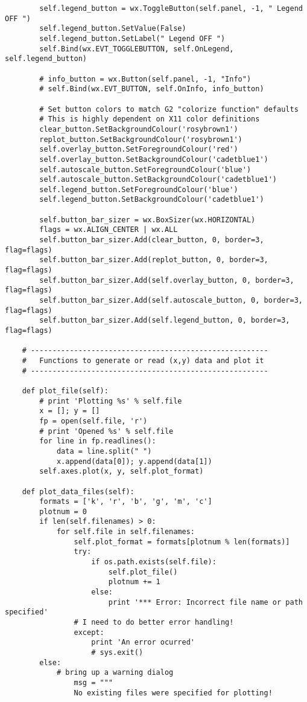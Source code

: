 \documentclass[12pt]{article}
\begin{document}
\begin{verbatim}
        self.legend_button = wx.ToggleButton(self.panel, -1, " Legend OFF ")
        self.legend_button.SetValue(False)
        self.legend_button.SetLabel(" Legend OFF ")
        self.Bind(wx.EVT_TOGGLEBUTTON, self.OnLegend, self.legend_button)

        # info_button = wx.Button(self.panel, -1, "Info")
        # self.Bind(wx.EVT_BUTTON, self.OnInfo, info_button)

        # Set button colors to match G2 "colorize function" defaults
        # This is highly dependent on X11 color definitions
        clear_button.SetBackgroundColour('rosybrown1')
        replot_button.SetBackgroundColour('rosybrown1')
        self.overlay_button.SetForegroundColour('red')
        self.overlay_button.SetBackgroundColour('cadetblue1')
        self.autoscale_button.SetForegroundColour('blue')
        self.autoscale_button.SetBackgroundColour('cadetblue1')
        self.legend_button.SetForegroundColour('blue')
        self.legend_button.SetBackgroundColour('cadetblue1')

        self.button_bar_sizer = wx.BoxSizer(wx.HORIZONTAL)
        flags = wx.ALIGN_CENTER | wx.ALL
        self.button_bar_sizer.Add(clear_button, 0, border=3, flag=flags)
        self.button_bar_sizer.Add(replot_button, 0, border=3, flag=flags)
        self.button_bar_sizer.Add(self.overlay_button, 0, border=3, flag=flags)
        self.button_bar_sizer.Add(self.autoscale_button, 0, border=3, flag=flags)
        self.button_bar_sizer.Add(self.legend_button, 0, border=3, flag=flags)

    # -------------------------------------------------------
    #   Functions to generate or read (x,y) data and plot it
    # -------------------------------------------------------

    def plot_file(self):
        # print 'Plotting %s' % self.file
        x = []; y = []
        fp = open(self.file, 'r')
        # print 'Opened %s' % self.file
        for line in fp.readlines():
            data = line.split(" ")
            x.append(data[0]); y.append(data[1])
        self.axes.plot(x, y, self.plot_format)

    def plot_data_files(self):
        formats = ['k', 'r', 'b', 'g', 'm', 'c']
        plotnum = 0
        if len(self.filenames) > 0:
            for self.file in self.filenames:
                self.plot_format = formats[plotnum % len(formats)]
                try:
                    if os.path.exists(self.file):
                        self.plot_file()
                        plotnum += 1
                    else:
                        print '*** Error: Incorrect file name or path specified'
                # I need to do better error handling!
                except:
                    print 'An error ocurred'
                    # sys.exit()
        else:
            # bring up a warning dialog
                msg = """
                No existing files were specified for plotting!


\end{verbatim}
\end{document}
